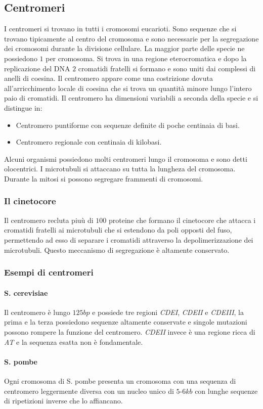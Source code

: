 \subsection{Centromeri}
I centromeri si trovano in tutti i cromosomi eucarioti. Sono sequenze che si trovano tipicamente al centro del cromosoma e sono necessarie per la segregazione dei cromosomi durante la
divisione cellulare. La maggior parte delle specie ne possiedono $1$ per cromosoma. Si trova in una regione eterocromatica e dopo la replicazione del DNA $2$ cromatidi fratelli si
formano e sono uniti dai complessi di anelli di coesina. Il centromero appare come una costrizione dovuta all'arricchimento locale di coesina che si trova un quantit\`a minore lungo
l'intero paio di cromatidi. Il centromero ha dimensioni variabili a seconda della specie e si distingue in:
\begin{itemize}
	\item Centromero puntiforme con sequenze definite di poche centinaia di basi.
	\item Centromero regionale con centinaia di kilobasi.
\end{itemize}
Alcuni organismi possiedono molti centromeri lungo il cromosoma e sono detti olocentrici. I microtubuli si attaccano su tutta la lungheza del cromosoma. Durante la mitosi si possono
segregare frammenti di cromosomi.
\subsubsection{Il cinetocore}
Il centromero recluta piu\`u di $100$ proteine che formano il cinetocore che attacca i cromatidi fratelli ai microtubuli che si estendono da poli opposti del fuso, permettendo ad esso
di separare i cromatidi attraverso la depolimerizzazione dei microtubuli. Questo meccanismo di segregazione \`e altamente conservato. 
\subsubsection{Esempi di centromeri}
\paragraph{S. cerevisiae} Il centromero \`e lungo $125bp$ e possiede tre regioni \emph{CDEI}, \emph{CDEII} e \emph{CDEIII}, la prima e la terza possiedono sequenze altamente conservate
e singole mutazioni possono rompere la funzione del centromero. \emph{CDEII} invece \`e una regione ricca di \emph{AT} e la sequenza esatta non \`e fondamentale.
\paragraph{S. pombe} Ogni cromosoma di S. pombe presenta un cromosoma con una sequenza di centromero leggermente diversa con un nucleo unico di $5$-$6kb$ con lunghe sequenze di 
ripetizioni inverse che lo affiancano.
